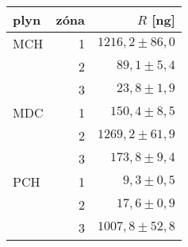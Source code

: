 \begin{tabular}{lrr}
\toprule
 plyn   & zóna   &       $R$ [ng] \\
\midrule
MCH & 1 &$ 1216,2\pm86,0$\\
    & 2 &$    89,1\pm5,4$\\
    & 3 &$    23,8\pm1,9$\\
MDC & 1 &$   150,4\pm8,5$\\
    & 2 &$ 1269,2\pm61,9$\\
    & 3 &$   173,8\pm9,4$\\
PCH & 1 &$     9,3\pm0,5$\\
    & 2 &$    17,6\pm0,9$\\
    & 3 &$ 1007,8\pm52,8$\\
\bottomrule
\end{tabular}
